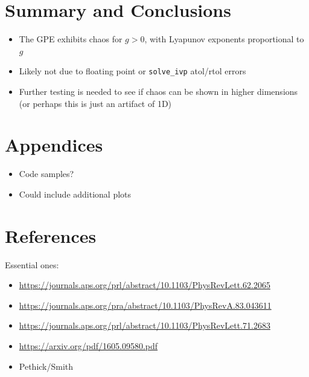\documentclass{homework}
\begin{document}
	\section{Summary and Conclusions} 
	\begin{itemize}
		\item The GPE exhibits chaos for $g>0$, with Lyapunov exponents proportional to $g$
		\item Likely not due to floating point or \texttt{solve\_ivp} atol/rtol errors
		\item Further testing is needed to see if chaos can be shown in higher dimensions (or perhaps this is just an artifact of 1D)
	\end{itemize}
	\section*{Appendices}
	\begin{itemize}
		\item Code samples?
		\item Could include additional plots
	\end{itemize}

	\section*{References}
	Essential ones:
	\begin{itemize}
		\item \href{https://journals.aps.org/prl/abstract/10.1103/PhysRevLett.62.2065}{https://journals.aps.org/prl/abstract/10.1103/PhysRevLett.62.2065}
		\item \href{https://journals.aps.org/pra/abstract/10.1103/PhysRevA.83.043611}{https://journals.aps.org/pra/abstract/10.1103/PhysRevA.83.043611}
		\item \href{https://journals.aps.org/prl/abstract/10.1103/PhysRevLett.71.2683}{https://journals.aps.org/prl/abstract/10.1103/PhysRevLett.71.2683}
		\item \href{https://arxiv.org/pdf/1605.09580.pdf}{https://arxiv.org/pdf/1605.09580.pdf}
		\item Pethick/Smith
	\end{itemize}
\end{document}
